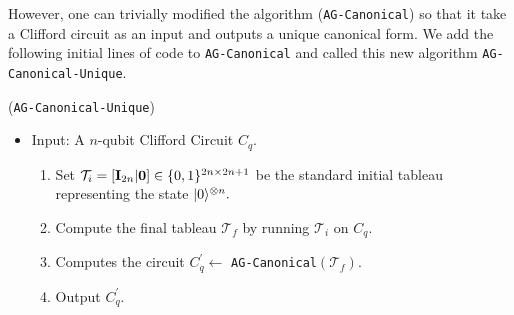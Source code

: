 However, one can trivially modified the algorithm ({\tt AG-Canonical}) \cite{AG04} so that it take a Clifford circuit as an input and outputs a unique canonical form. We add the following initial lines of code to {\tt AG-Canonical} and called this new algorithm {\tt AG-Canonical-Unique}. 
  
 


  

\begin{framed}
\begin{flushleft}
({\tt AG-Canonical-Unique})
\begin{itemize}
\item[] Input: A $n$-qubit Clifford Circuit $C_q.$
\begin{enumerate}
\item Set $\mathcal{T}_i=[{\bf I}_{2n}|{\bf 0}]\in \{0,1\}^{2n \times 2n+1}$ be the standard  initial tableau  representing the state ${\lvert}0\rangle^{\otimes n}.$ 
\item Compute the final tableau $\mathcal{T}_f$ by running $\mathcal{T}_i$ on $C_q.$
\item Computes  the circuit $C_q^\prime \leftarrow$ {\tt AG-Canonical}$(\mathcal{T}_f).$
\item Output $C_q^\prime.$
\end{enumerate}
\end{itemize}
\end{flushleft}
\end{framed}

